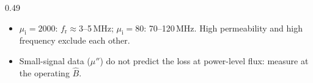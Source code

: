 \begin{frame}
\begin{columns}[T]
\begin{column}{0.49\textwidth}
\begin{itemize}
\begin{equation*}
					      (\mu_\mathrm{i}-1)\,f_\mathrm{r}\approx\frac{2}{3}\,\frac{\gamma}{2\pi}\,\mu_0M_\mathrm{s}\approx5\text{--}9\,\mathrm{GHz}
				      \end{equation*}
				      with $\gamma/2\pi=28$\,GHz/T and $\mu_0M_\mathrm{s}=0.3$--0.5\,T.
				\item $\mu_\mathrm{i}=2000$: $f_\mathrm{r}\approx3$--5\,MHz; $\mu_\mathrm{i}=80$: 70--120\,MHz. High permeability and high frequency exclude each other.
				\item Small-signal data ($\mu''$) do not predict the loss at power-level flux: measure at the operating $\hat{B}$.
			\end{itemize}
		\end{column}
	\end{columns}
\end{frame}


